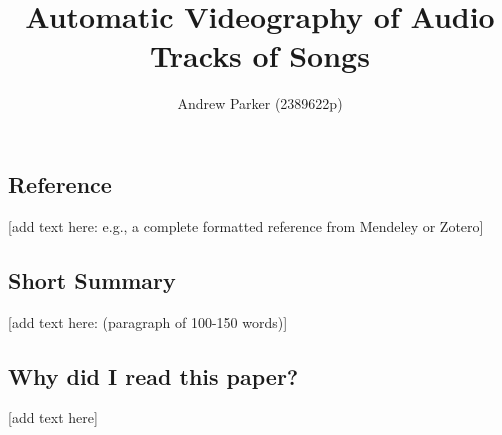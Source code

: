 \documentclass[11pt,a4paper]{article}
\title{Automatic Videography of Audio Tracks of Songs}
\author{Andrew Parker (2389622p)}
\begin{document}
\maketitle

\subsection*{Reference}
[add text here: e.g., a complete formatted reference from Mendeley or Zotero]

\subsection*{Short Summary} 
[add text here: (paragraph of 100-150 words)]

\subsection*{Why did I read this paper?}
[add text here] \cite{jorgenson1995computers}



\end{document}
